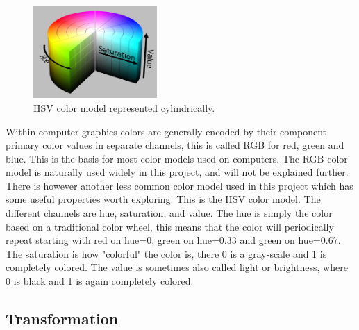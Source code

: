 
\begin{figure}
    \begin{center}
        \includegraphics[width=0.42\textwidth]{fig/hsv_illustration}
    \end{center}
    \caption{HSV color model represented cylindrically.}
\end{figure}

Within computer graphics colors are generally encoded by their component primary color values in separate channels, this is called RGB for red, green and blue. This is the basis for most color models used on computers. The RGB color model is naturally used widely in this project, and will not be explained further. There is however another less common color model used in this project which has some useful properties worth exploring. 
This is the HSV color model. The different channels are hue, saturation, and value. The hue is simply the color based on a traditional color wheel, this means that the color will periodically repeat starting with red on hue=0, green on hue=0.33 and green on hue=0.67. The saturation is how "colorful" the color is, there 0 is a gray-scale and 1 is completely colored. The value is sometimes also called light or brightness, where 0 is black and 1 is again completely colored.


\subsection*{Transformation}\label{chap:transformation}







